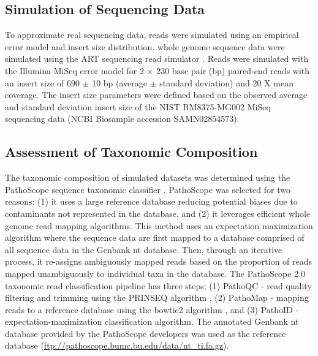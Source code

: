 \documentclass[fleqn,10pt,lineno]{wlpeerj}\usepackage[]{graphicx}\usepackage[]{color}
\begin{document}
\subsection*{Simulation of Sequencing Data}
To approximate real sequencing data, reads were simulated using an empirical error model and insert size distribution.
whole genome sequence data were simulated using the ART sequencing read simulator \citep{Huang2012}.
Reads were simulated with the Illumina MiSeq error model for 2 $\times$ 230 base pair (bp) paired-end reads with an insert size of 690 $\pm$ 10 bp (average $\pm$ standard deviation) and 20 X mean coverage.
The insert size parameters were defined based on the observed average and standard deviation insert size of the NIST RM8375-MG002 MiSeq sequencing data \citep{olson2016pepr} (NCBI Biosample accession SAMN02854573).

\subsection*{Assessment of Taxonomic Composition}
The taxonomic composition of simulated datasets was determined using the PathoScope sequence taxonomic classifier \citep{Francis2013}.
PathoScope was selected for two reasons: (1) it uses a large reference database reducing potential biases due to contaminants not represented in the database, and (2) it leverages efficient whole genome read mapping algorithms.
This method uses an expectation maximization algorithm where the sequence data are first mapped to a database comprised of all sequence data in the Genbank nt database.
Then, through an iterative process, it re-assigns ambiguously mapped reads based on the proportion of reads mapped unambiguously to individual taxa in the database.
The PathoScope 2.0 taxonomic read classification pipeline has three steps; (1) PathoQC - read quality filtering and trimming using the PRINSEQ algorithm \citep{schmieder2011quality}, (2) PathoMap - mapping reads to a reference database using the bowtie2 algorithm \citep{Langmead2012}, and (3) PathoID - expectation-maximization classification algorithm.
The annotated Genbank nt database provided by the PathoScope developers was used as the reference database (\url{ftp://pathoscope.bumc.bu.edu/data/nt\_ti.fa.gz}).
\end{document}

